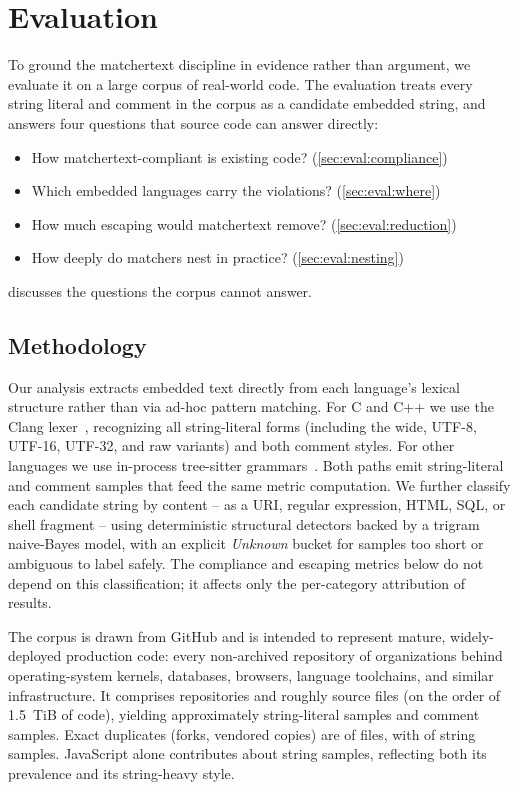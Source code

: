 \section{Evaluation}
\label{sec:eval}

To ground the matchertext discipline in evidence rather than argument,
we evaluate it on a large corpus of real-world code.
The evaluation treats every string literal and comment in the corpus
as a candidate embedded string,
and answers four questions that source code can answer directly:
\begin{itemize}
\item[\textbf{Q1}] How matchertext-compliant is existing code? (\cref{sec:eval:compliance})
\item[\textbf{Q2}] Which embedded languages carry the violations? (\cref{sec:eval:where})
\item[\textbf{Q3}] How much escaping would matchertext remove? (\cref{sec:eval:reduction})
\item[\textbf{Q4}] How deeply do matchers nest in practice? (\cref{sec:eval:nesting})
\end{itemize}
 discusses the questions the corpus cannot answer.


\subsection{Methodology}
\label{sec:eval:methodology}

Our analysis extracts embedded text directly from each language's
lexical structure rather than via ad-hoc pattern matching.
For C and C++ we use the Clang lexer~\cite{lattner04llvm,llvm26clang},
recognizing all string-literal forms (including the wide, UTF-8,
UTF-16, UTF-32, and raw variants) and both comment styles.
For other languages we use
in-process tree-sitter grammars~\cite{brunsfeld26treesitter}.
Both paths emit string-literal and comment samples
that feed the same metric computation.
We further classify each candidate string by content --
\eg as a URI, regular expression, HTML, SQL, or shell fragment --
using deterministic structural detectors backed by
a trigram naive-Bayes model,
with an explicit \emph{Unknown} bucket for samples too short or ambiguous
to label safely.
The compliance and escaping metrics below
do not depend on this classification;
it affects only the per-category attribution of results.

The corpus is drawn from GitHub
and is intended to represent mature, widely-deployed production code:
every non-archived repository of \dataOrgs organizations
behind operating-system kernels, databases, browsers,
language toolchains, and similar infrastructure.
It comprises \dataRepos repositories and roughly \dataFiles source files
(on the order of 1.5~TiB of code),
yielding approximately \dataStrSamples string-literal samples
and \dataDocSamples comment samples.
Exact duplicates (forks, vendored copies) are \dataDupFileShare of files, with \dataDupStringShare of string samples.
JavaScript alone contributes about \dataJsStrSamples string samples,
reflecting both its prevalence and its string-heavy style.

